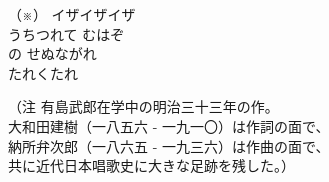 ﻿\documentclass[10pt,a5j]{tarticle} %
\begin{document}
\begin{enumerate}
\begin{minipage}[c]{\blocksize}
	\end{minipage}
	\begin{minipage}[c]{0.5\hsize}
		\vspace{\linespace}
		（※） 
		イザイザイザ\\
		うちつれて
		むはぞ\\
		の
		せぬながれ\\
		たれくたれ\\
	\end{minipage}
	\begin{minipage}[c]{0.5\hsize}
		\vspace{\linespace}
		（注 有島武郎在学中の明治三十三年の作。\\
		大和田建樹（一八五六 - 一九一〇）は作詞の面で、\\
		納所弁次郎（一八六五 - 一九三六）は作曲の面で、\\
		共に近代日本唱歌史に大きな足跡を残した。）
	\end{minipage}
\end{enumerate}
\end{document}
